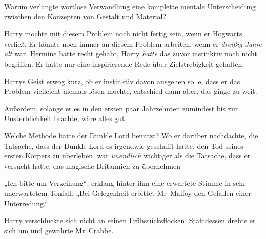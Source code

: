 Warum verlangte wortlose Verwandlung eine komplette mentale Unterscheidung zwischen den Konzepten von Gestalt und Material?

Harry mochte mit diesem Problem noch nicht fertig sein, wenn er Hogwarts verließ. Er könnte noch immer an diesem Problem arbeiten, wenn er \emph{dreißig Jahre alt} war. Hermine hatte recht gehabt, Harry \emph{hatte} das zuvor instinktiv noch nicht begriffen. Er hatte nur eine inspirierende Rede über Zielstrebigkeit gehalten.

Harrys Geist erwog kurz, ob er instinktiv davon ausgehen solle, dass er das Problem vielleicht niemals lösen mochte, entschied dann aber, das ginge zu weit.

Außerdem, solange er es in den ersten paar Jahrzehnten zumindest bis zur Unsterblichkeit brachte, wäre alles gut.

Welche Methode hatte der Dunkle Lord benutzt? Wo er darüber nachdachte, die Tatsache, dass der Dunkle Lord es irgendwie geschafft hatte, den Tod seines ersten Körpers zu überleben, war \emph{unendlich} wichtiger als die Tatsache, dass er versucht hatte, das magische Britannien zu übernehmen —

„Ich bitte um Verzeihung“, erklang hinter ihm eine erwartete Stimme in sehr unerwartetem Tonfall.
„Bei Gelegenheit erbittet Mr~Malfoy den Gefallen einer Unterredung.“

Harry verschluckte sich nicht an seinen Frühstücksflocken. Stattdessen drehte er sich um und gewahrte Mr~Crabbe.

